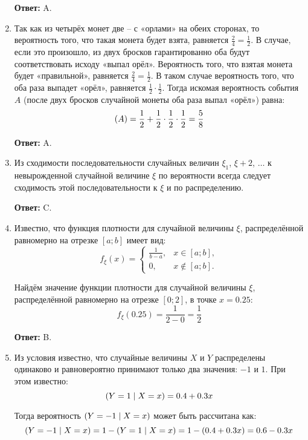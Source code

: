 \documentclass[a4paper]{article} %
\let\P\relax
\DeclareMathOperator{\P}{\mathbb{P}}
\begin{document}
\begin{enumerate}
    \textbf{Ответ:} A.
    
    
    \item 
    Так как из четырёх монет две -- с «орлами» на обеих сторонах, то вероятность того, что такая монета будет взята, равняется $\frac{2}{4} = \frac{1}{2}$.
    В случае, если это произошло, из двух бросков гарантированно оба будут соответствовать исходу «выпал орёл».
    Вероятность того, что взятая монета будет «правильной», равняется $\frac{2}{4} = \frac{1}{2}$.
    В таком случае вероятность того, что оба раза выпадет «орёл», равняется $\frac{1}{2}\cdot\frac{1}{2}$.
    Тогда искомая вероятность события $A$ (после двух бросков случайной монеты оба раза выпал «орёл») равна:
     \[
     \P(A) = \frac{1}{2} + \frac{1}{2} \cdot \frac{1}{2} \cdot \frac{1}{2} = \frac{5}{8}
     \]
    
    \textbf{Ответ:} A.
    
    
    \item
    Из сходимости последовательности случайных величин $\xi_{1}$, $\xi+{2}$, $\ldots$ к невырожденной случайной величине $\xi$ по вероятности всегда следует сходимость этой последовательности к $\xi$ и по распределению.
    
    \textbf{Ответ:} C.
    
    
    \item
    Известно, что функция плотности для случайной величины $\xi$, распределённой равномерно на отрезке $[a; b]$ имеет вид:
    \[
    f_{\xi}(x) =
    \begin{cases}
    \frac{1}{b - a}, & x \in [a; b], \\
    0, & x \notin [a; b].
    \end{cases}
    \]
    
    Найдём значение функции плотности для случайной величины $\xi$, распределённой равномерно на отрезке $[0; 2]$, в точке $x = 0.25$:
    \[
    f_{\xi}(0.25) = \frac{1}{2 - 0} = \frac{1}{2}
    \]
    
    \textbf{Ответ:} B.
    

    \item
    Из условия известно, что случайные величины $X$ и $Y$ распределены одинаково и равновероятно принимают только два значения: $-1$ и $1$.
    При этом известно:
    \[
    \P(Y = 1 \mid X = x) = 0.4 + 0.3x
    \]
    
    Тогда вероятность $\P(Y = -1 \mid X = x)$ может быть рассчитана как:
    \[
    \P(Y = -1 \mid X = x)  = 1 - \P(Y = 1 \mid X = x) = 1 - (0.4 + 0.3x) = 0.6 - 0.3x
    \]
    

\end{enumerate}
\end{document}
